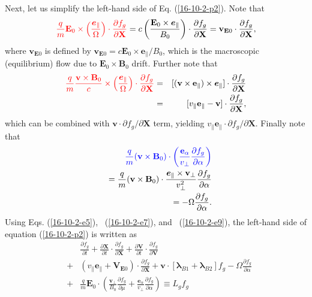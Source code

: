 \documentclass{article}
\newcommand{\tmcolor}[2]{{\color{#1}{#2}}}
\newcommand{\tmmathbf}[1]{\ensuremath{\boldsymbol{#1}}}
\begin{document}
Next, let us simplify the left-hand side of Eq. (\ref{16-10-2-p2}). Note that
\begin{equation}
  \label{16-10-2-e5} \tmcolor{red}{\frac{q}{m} \mathbf{E}_0 \times \left(
  \frac{\tmmathbf{e}_{\parallel}}{\Omega}  \right) \cdot \frac{\partial
  f_g}{\partial \mathbf{X}}} = c \left( \frac{\mathbf{E}_0 \times
  \tmmathbf{e}_{\parallel}}{B_0}  \right) \cdot \frac{\partial f_g}{\partial
  \mathbf{X}} =\mathbf{v}_{\mathbf{E}0} \cdot \frac{\partial f_g}{\partial
  \mathbf{X}},
\end{equation}
where $\mathbf{v}_{\mathbf{E}0}$ is defined by $\mathbf{v}_{\mathbf{E}0} =
c\mathbf{E}_0 \times \mathbf{e}_{\parallel} / B_0$, which is the macroscopic
(equilibrium) flow due to $\mathbf{E}_0 \times \mathbf{B}_0$ drift. Further
note that
\begin{eqnarray}
  \tmcolor{red}{\frac{q}{m}  \frac{\mathbf{v} \times \mathbf{B}_0}{c} \times
  \left( \frac{\tmmathbf{e}_{\parallel}}{\Omega}  \right) \cdot \frac{\partial
  f_g}{\partial \mathbf{X}}} & = & [(\mathbf{v} \times \mathbf{e}_{\parallel})
  \times \tmmathbf{e}_{\parallel}] \cdot \frac{\partial f_g}{\partial
  \mathbf{X}} \nonumber\\
  & = & [v_{\parallel} \mathbf{e}_{\parallel} -\mathbf{v}] \cdot
  \frac{\partial f_g}{\partial \mathbf{X}},  \label{16-10-2-e7}
\end{eqnarray}
which can be combined with $\mathbf{v} \cdot \partial f_g / \partial
\mathbf{X}$ term, yielding $v_{\parallel} \mathbf{e}_{\parallel} \cdot
\partial f_g / \partial \mathbf{X}$. Finally note that
\begin{eqnarray}
  &  & \tmcolor{blue}{\frac{q}{m}  (\mathbf{v} \times \mathbf{B}_0) \cdot
  \left( \frac{\mathbf{e}_{\alpha}}{v_{\perp}}  \frac{\partial f_g}{\partial
  \alpha} \right)} \nonumber\\
  &  & = \frac{q}{m}  (\mathbf{v} \times \mathbf{B}_0) \cdot
  \frac{\tmmathbf{e}_{\parallel} \times \mathbf{v}_{\perp}}{v_{\perp}^2} 
  \frac{\partial f_g}{\partial \alpha} \nonumber\\
  &  & = - \Omega \frac{\partial f_g}{\partial \alpha} .  \label{16-10-2-e9}
\end{eqnarray}
Using Eqs. (\ref{16-10-2-e5}), \ (\ref{16-10-2-e7}), and \ (\ref{16-10-2-e9}),
the left-hand side of equation (\ref{16-10-2-p2}) is written as
\begin{eqnarray}
  &  & \frac{\partial f_g}{\partial t} + \frac{\partial \mathbf{X}}{\partial
  t} \cdot \frac{\partial f_g}{\partial \mathbf{X}} + \frac{\partial
  \mathbf{V}}{\partial t} \cdot \frac{\partial f_g}{\partial \mathbf{V}}
  \nonumber\\
  & + & (v_{\parallel} \mathbf{e}_{\parallel} +\mathbf{V}_{\mathbf{E}0})
  \cdot \frac{\partial f_g}{\partial \mathbf{X}} +\mathbf{v} \cdot
  [\tmmathbf{\lambda}_{B 1} +\tmmathbf{\lambda}_{B 2}] f_g - \Omega
  \frac{\partial f_g}{\partial \alpha} \nonumber\\
  & + & \frac{q}{m} \mathbf{E}_0 \cdot \left( \frac{\mathbf{v}_{\perp}}{B_0} 
  \frac{\partial f_g}{\partial \mu} + \frac{\tmmathbf{e}_{\alpha}}{v_{\perp}} 
  \frac{\partial f_g}{\partial \alpha} \right) \equiv L_g f_g 
  \label{16-9-22-1b}
\end{eqnarray}
\end{document}
